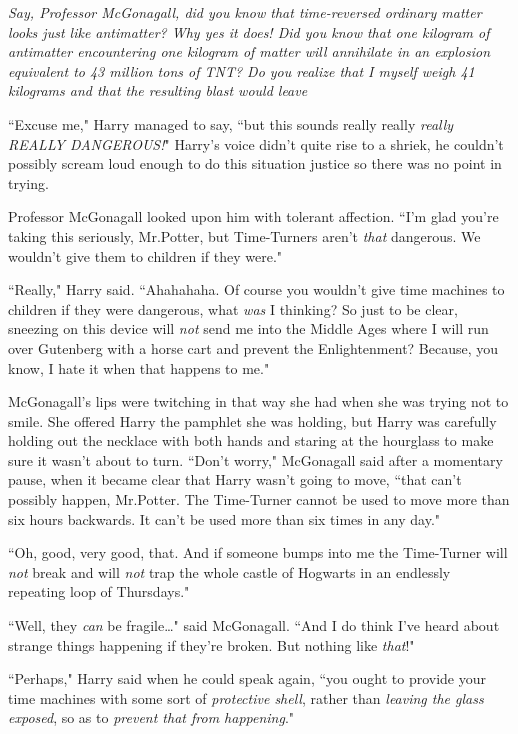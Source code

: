 \emph{Say, Professor McGonagall, did you know that time-reversed ordinary matter looks just like antimatter? Why yes it does! Did you know that one kilogram of antimatter encountering one kilogram of matter will annihilate in an explosion equivalent to 43 million tons of TNT? Do you realize that I myself weigh 41 kilograms and that the resulting blast would leave }

``Excuse me," Harry managed to say, ``but this sounds really really \emph{really REALLY DANGEROUS!}" Harry's voice didn't quite rise to a shriek, he couldn't possibly scream loud enough to do this situation justice so there was no point in trying.

Professor McGonagall looked upon him with tolerant affection. ``I'm glad you're taking this seriously, Mr.\?Potter, but Time-Turners aren't \emph{that} dangerous. We wouldn't give them to children if they were."

``Really," Harry said. ``Ahahahaha. Of course you wouldn't give time machines to children if they were dangerous, what \emph{was} I thinking? So just to be clear, sneezing on this device will \emph{not} send me into the Middle Ages where I will run over Gutenberg with a horse cart and prevent the Enlightenment? Because, you know, I hate it when that happens to me."

McGonagall's lips were twitching in that way she had when she was trying not to smile. She offered Harry the pamphlet she was holding, but Harry was carefully holding out the necklace with both hands and staring at the hourglass to make sure it wasn't about to turn. ``Don't worry," McGonagall said after a momentary pause, when it became clear that Harry wasn't going to move, ``that can't possibly happen, Mr.\?Potter. The Time-Turner cannot be used to move more than six hours backwards. It can't be used more than six times in any day."

``Oh, good, very good, that. And if someone bumps into me the Time-Turner will \emph{not} break and will \emph{not} trap the whole castle of Hogwarts in an endlessly repeating loop of Thursdays."

``Well, they \emph{can} be fragile{\ldots}" said McGonagall. ``And I do think I've heard about strange things happening if they're broken. But nothing like \emph{that}!"

``Perhaps," Harry said when he could speak again, ``you ought to provide your time machines with some sort of \emph{protective shell}, rather than \emph{leaving the glass exposed}, so as to \emph{prevent that from happening}."

